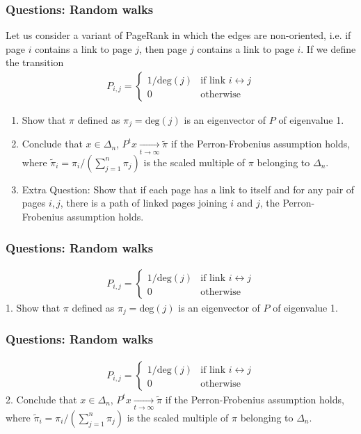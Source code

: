 \documentclass{beamer}
\begin{document}
\begin{frame}[t]
\frametitle{Questions: Random walks}
Let us consider a variant of PageRank in which the edges are non-oriented, i.e. if page $i$ contains a link to page $j$, then page $j$ contains a link to page $i$. If we define the transition 
\begin{align*}
P_{i,j} =
\begin{cases}
1/\text{deg}(j) &\text{if link } i \leftrightarrow j  \\
0 &\text{otherwise}
\end{cases}
\end{align*}
\begin{enumerate}
\item Show that $\pi$ defined as $\pi_j = \text{deg}(j)$ is an eigenvector of $P$ of eigenvalue 1.
\item Conclude that $x \in \Delta_n$,  $P^t x \xrightarrow[t \to \infty]{} \tilde{\pi}$ if the Perron-Frobenius assumption holds, where $\tilde{\pi}_i = \pi_i / (\sum_{j=1}^n \pi_j)$ is the scaled multiple of $\pi$ belonging to $\Delta_n$.
\item Extra Question: Show that if each page has a link to itself and for any pair of pages $i,j$, there is a path of linked pages joining $i$ and $j$, the Perron-Frobenius assumption holds.
\end{enumerate}
\end{frame}

\begin{frame}[t]
\frametitle{Questions: Random walks}
\vspace{-10pt}
\begin{align*}
P_{i,j} =
\begin{cases}
1/\text{deg}(j) &\text{if link } i \leftrightarrow j  \\
0 &\text{otherwise}
\end{cases}
\end{align*}
1. Show that $\pi$ defined as $\pi_j = \text{deg}(j)$ is an eigenvector of $P$ of eigenvalue 1.
\end{frame}

\begin{frame}[t]
\frametitle{Questions: Random walks}
\vspace{-10pt}
\begin{align*}
P_{i,j} =
\begin{cases}
1/\text{deg}(j) &\text{if link } i \leftrightarrow j  \\
0 &\text{otherwise}
\end{cases}
\end{align*}
2. Conclude that $x \in \Delta_n$,  $P^t x \xrightarrow[t \to \infty]{} \tilde{\pi}$ if the Perron-Frobenius assumption holds, where $\tilde{\pi}_i = \pi_i / (\sum_{j=1}^n \pi_j)$ is the scaled multiple of $\pi$ belonging to $\Delta_n$.
\end{frame}
\end{document}
